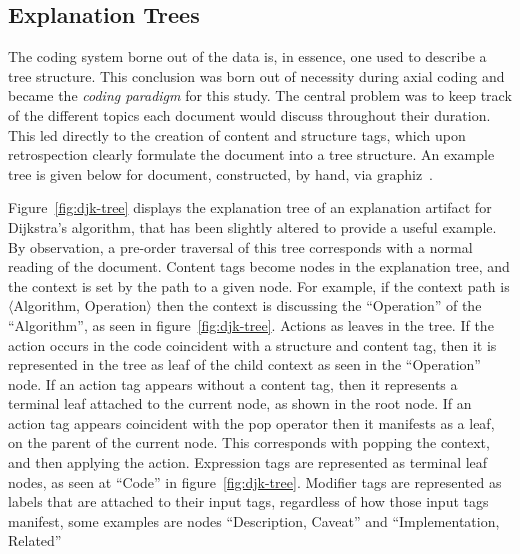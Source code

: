 \documentclass[sigconf]{acmart}
\newcommand{\brackets}[1]{$\langle$\ignorespaces#1\unskip$\rangle$}
\begin{document}
\subsection{Explanation Trees}
\label{sec:res:xopTree}
The coding system borne out of the data is, in essence, one used to describe a
tree structure. This conclusion was born out of necessity during axial coding
and became the \emph{coding paradigm} for this study. The central problem was to
keep track of the different topics each document would discuss throughout their
duration. This led directly to the creation of content and structure tags, which
upon retrospection clearly formulate the document into a tree structure. An
example tree is given below for document, constructed, by hand, via
graphiz~\cite{Ellson2002}.



Figure~\ref{fig:djk-tree} displays the explanation tree of an explanation
artifact for Dijkstra's algorithm, that has been slightly altered to provide a
useful example. By observation, a pre-order traversal of this tree corresponds
with a normal reading of the document. Content tags become nodes in the
explanation tree, and the context is set by the path to a given node. For
example, if the context path is \brackets{Algorithm, Operation} then the context
is discussing the ``Operation'' of the ``Algorithm'', as seen in
figure~\ref{fig:djk-tree}. Actions as leaves in the tree. If the action occurs
in the code coincident with a structure and content tag, then it is represented
in the tree as leaf of the child context as seen in the ``Operation'' node. If
an action tag appears without a content tag, then it represents a terminal leaf
attached to the current node, as shown in the root node. If an action tag
appears coincident with the pop operator then it manifests as a leaf, on the
parent of the current node. This corresponds with popping the context, and then
applying the action. Expression tags are represented as terminal leaf nodes, as
seen at ``Code'' in figure~\ref{fig:djk-tree}. Modifier tags are represented as
labels that are attached to their input tags, regardless of how those input tags
manifest, some examples are nodes ``Description, Caveat'' and ``Implementation,
Related''
\end{document}
